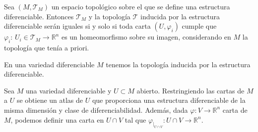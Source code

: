 \begin{prop}
Sea $(M, \mathcal{T}_M)$ un espacio topológico sobre el que se define una estructura diferenciable. Entonces $\mathcal{T}_M$ y la topología $\mathcal T$ inducida por la estructura diferenciable serán iguales si y solo si toda carta $(U, \varphi_i)$ cumple que $\varphi_i:\,U_i \in \mathcal{T}_M \longrightarrow \mathbb{R}^n$ es un homeomorfismo sobre su imagen, considerando en $M$ la topología que tenía a priori.
\end{prop}

\begin{cor}
En una variedad diferenciable $M$ tenemos la topología inducida por la estructura diferenciable.\end{cor}

\begin{ejems}
    Sea $M$ una variedad diferenciable y $U \subset M$ abierto. Restringiendo las cartas de $M$ a $U$ se obtiene un atlas de $U$ que proporciona una estructura diferenciable de la misma dimensi\'on y clase de diferenciabilidad. Adem\'as,  dada $\varphi: V \longrightarrow \mathbb R^n$ carta de $M$, podemos definir una carta en $U\cap V$ tal que $\varphi_{|_{U \cap V}}: U\cap V \longrightarrow \mathbb R^n$.
\end{ejems}


